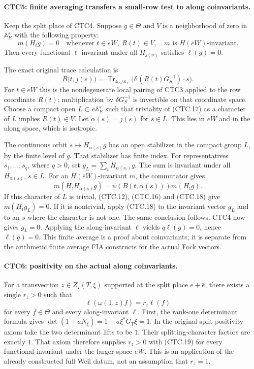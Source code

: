 \paragraph{CTC5: finite averaging transfers a small-row test to along coinvariants.}
\label{claim:CTC5}
Keep the split place of CTC4.  Suppose $g\in\Theta$ and $V$ is a
neighborhood of zero in $\mathbb A_E^s$ with the following property:
\[
 m(H_tg)=0\quad\text{whenever }t\in eW,\ R(t)\in V,
 \quad m\text{ is }H(\bar eW)\text{-invariant}.
 \tag{CTC.16}
\]
Then every functional $\ell$ invariant under all $H_{j(a)}$
satisfies $\ell(g)=0$.

The exact original trace calculation is
\[
 B\bigl(t,j(\bar s)\bigr)
   =\operatorname{Tr}_{\mathbb A_E/\mathbb A_F}
        \bigl(\delta\,(R(t)G_S^{-1})\cdot s\bigr).
 \tag{CTC.17}
\]
For $t\in eW$ this is the nondegenerate local pairing of CTC3
applied to the row coordinate $R(t)$; multiplication by
$\delta G_S^{-1}$ is invertible on that coordinate space.
Choose a compact open $L\subset e\mathbb A_E^s$ such that
triviality of (CTC.17) as a character of $L$ implies $R(t)\in V$.
Let $\alpha(s)=j(\bar s)$ for $s\in L$.  This lies in $\bar eW$
and in the along space, which is isotropic.

The continuous orbit $s\mapsto H_{\alpha(s)}g$ has an open
stabilizer in the compact group $L$, by the finite level of $g$.
That stabilizer has finite index.  For representatives $s_1,\ldots,s_q$,
where $q>0$, set $g_L=\sum_i H_{\alpha(s_i)}g$.
The sum is invariant under all $H_{\alpha(s)}$, $s\in L$.
For an $H(\bar eW)$-invariant $m$, the commutator gives
\[
 m(H_tH_{\alpha(s)}g)
          =\psi(B(t,\alpha(s)))m(H_tg).
 \tag{CTC.18}
\]
If this character of $L$ is trivial, (CTC.12), (CTC.16) and
(CTC.18) give $m(H_tg_L)=0$.  If it is nontrivial, apply (CTC.18)
to the invariant vector $g_L$ and to an $s$ where the character is
not one.  The same conclusion follows.  CTC4 now gives $g_L=0$.
Applying the along-invariant $\ell$ yields $q\ell(g)=0$, hence
$\ell(g)=0$.  This finite average is a proof about coinvariants;
it is separate from the arithmetic finite average FIA constructs
for the actual Fock vectors.

\paragraph{CTC6: positivity on the actual along coinvariants.}
\label{claim:CTC6}
For a transvection $z\in Z_I(T,\xi)$ supported at the split place
$e+\bar e$, there exists a single $r_z>0$ such that
\[
             \ell(\omega(1,z)f)=r_z\ell(f)
 \tag{CTC.19}
\]
for every $f\in\Theta$ and every along-invariant $\ell$.
First, the rank-one determinant formula gives
$\det(1+aN_\xi)=1+a\xi^*G_T\xi=1$.
In the original split-positivity axiom take the two determinant
lifts to be $1$.  Their splitting-character factors are exactly
$1$.  That axiom therefore supplies $r_z>0$ with (CTC.19) for
every functional invariant under the larger space $\bar eW$.
This is an application of the already constructed full Weil datum,
not an assumption that $r_z=1$.

